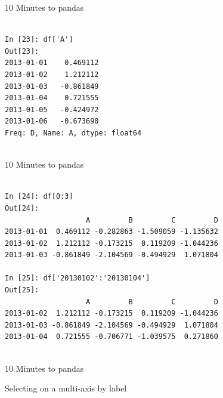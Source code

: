 \documentclass{beamer}
\begin{document}
\begin{frame}[t,fragile]{10 Minutes to pandas}


	\scriptsize
\begin{verbatim}

In [23]: df['A']
Out[23]: 
2013-01-01    0.469112
2013-01-02    1.212112
2013-01-03   -0.861849
2013-01-04    0.721555
2013-01-05   -0.424972
2013-01-06   -0.673690
Freq: D, Name: A, dtype: float64


\end{verbatim}


\end{frame}

\begin{frame}[t,fragile]{10 Minutes to pandas}


	\scriptsize
\begin{verbatim}

In [24]: df[0:3]
Out[24]: 
                   A         B         C         D
2013-01-01  0.469112 -0.282863 -1.509059 -1.135632
2013-01-02  1.212112 -0.173215  0.119209 -1.044236
2013-01-03 -0.861849 -2.104569 -0.494929  1.071804

In [25]: df['20130102':'20130104']
Out[25]: 
                   A         B         C         D
2013-01-02  1.212112 -0.173215  0.119209 -1.044236
2013-01-03 -0.861849 -2.104569 -0.494929  1.071804
2013-01-04  0.721555 -0.706771 -1.039575  0.271860


\end{verbatim}


\end{frame}



%
%
%
%
%
%
%
%
%


\begin{frame}[t]{10 Minutes to pandas}

Selecting on a multi-axis by label

\end{frame}
\end{document}
